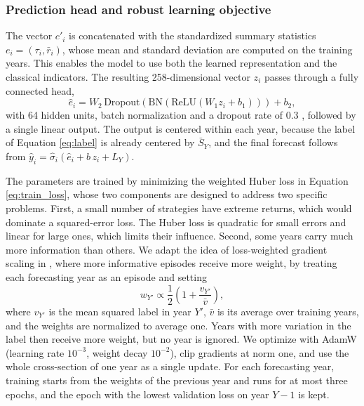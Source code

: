 \documentclass[pdflatex,sn-mathphys-num]{sn-jnl}%
\theoremstyle{thmstyleone}%
\theoremstyle{thmstyletwo}%
\theoremstyle{thmstylethree}%
\begin{document}
\subsubsection{Prediction head and robust learning objective}\label{subsubModel5}
The vector $c'_i$ is concatenated with the standardized summary statistics $e_i = (\tau_i, \bar{r}_i)$, whose mean and standard deviation are computed on the training years. This enables the model to use both the learned representation and the classical indicators. The resulting 258-dimensional vector $z_i$ passes through a fully connected head,
\begin{equation}
\hat{e}_i = W_2\, \mathrm{Dropout}\!\left(\mathrm{BN}\!\left(\mathrm{ReLU}(W_1 z_i + b_1)\right)\right) + b_2,
\label{eq:head}
\end{equation}
with 64 hidden units, batch normalization \cite{ioffe2015batch} and a dropout rate of 0.3 \cite{srivastava2014dropout}, followed by a single linear output. The output is centered within each year, because the label of Equation \eqref{eq:label} is already centered by $\bar{S}_Y$, and the final forecast follows from $\hat{y}_i = \hat{\sigma}_i(\hat{e}_i + b\, z_i + L_Y)$.

The parameters are trained by minimizing the weighted Huber loss in Equation \eqref{eq:train_loss}, whose two components are designed to address two specific problems. First, a small number of strategies have extreme returns, which would dominate a squared-error loss. The Huber loss \cite{huber1964robust} is quadratic for small errors and linear for large ones, which limits their influence. Second, some years carry much more information than others. We adapt the idea of loss-weighted gradient scaling in \cite{holen2024loss}, where more informative episodes receive more weight, by treating each forecasting year as an episode and setting
\begin{equation}
w_{Y'} \propto \frac{1}{2}\left(1 + \frac{v_{Y'}}{\bar{v}}\right),
\label{eq:year_weight}
\end{equation}
where $v_{Y'}$ is the mean squared label in year $Y'$, $\bar{v}$ is its average over training years, and the weights are normalized to average one. Years with more variation in the label then receive more weight, but no year is ignored. We optimize with AdamW \cite{loshchilov2019decoupled} (learning rate $10^{-3}$, weight decay $10^{-2}$), clip gradients at norm one, and use the whole cross-section of one year as a single update. For each forecasting year, training starts from the weights of the previous year and runs for at most three epochs, and the epoch with the lowest validation loss on year $Y-1$ is kept.
\end{document}

